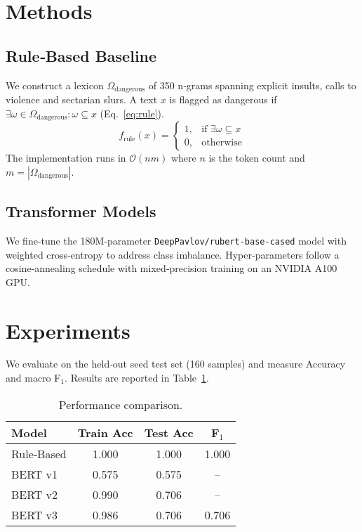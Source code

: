 \documentclass{article}
\begin{document}
\section{Methods}
\subsection{Rule‑Based Baseline}
We construct a lexicon $\Omega_{\text{dangerous}}$ of 350 n‑grams spanning explicit insults, calls to violence and sectarian slurs. A text $x$ is flagged as dangerous if $\exists \omega\in\Omega_{\text{dangerous}}:\omega\subseteq x$ (Eq.~\ref{eq:rule}).
\begin{equation}
  f_{\text{rule}}(x)=\begin{cases}1,&\text{if }\exists\omega\subseteq x\\ 0,&\text{otherwise}\end{cases}
  \label{eq:rule}
\end{equation}
The implementation runs in $\mathcal{O}(n m)$ where $n$ is the token count and $m=|\Omega_{\text{dangerous}}|$.

\subsection{Transformer Models}
We fine‑tune the 180M‑parameter \texttt{DeepPavlov/rubert-base-cased} model with weighted cross‑entropy to address class imbalance. Hyper‑parameters follow a cosine‑annealing schedule with mixed‑precision training on an NVIDIA A100 GPU.

\section{Experiments}
We evaluate on the held‑out seed test set (160 samples) and measure Accuracy and macro F$_1$. Results are reported in Table~\ref{tab:results}.
\begin{table}[h]
\centering
\begin{tabular}{lccc}
\hline
Model & Train Acc & Test Acc & F$_1$ \\ \hline
Rule‑Based & 1.000 & 1.000 & 1.000 \\
BERT v1 & 0.575 & 0.575 & -- \\
BERT v2 & 0.990 & 0.706 & -- \\
BERT v3 & 0.986 & 0.706 & 0.706 \\ \hline
\end{tabular}
\caption{Performance comparison.}
\label{tab:results}
\end{table}
\end{document}
